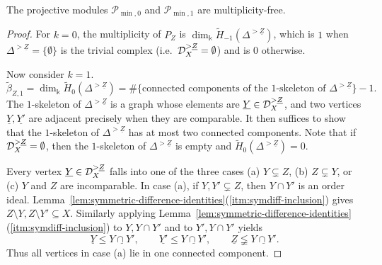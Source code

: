 \documentclass[a4paper,leqno]{amsart}
\begin{document}
\begin{prop}\label{prop:low-degree-multiplicity}
The projective modules $\mathcal P_{\min,0}$ and $\mathcal P_{\min,1}$ are multiplicity-free.
\end{prop}

\begin{proof}
For $k=0$, the multiplicity of $P_Z$ is $\dim_{\Bbbk}\widetilde H_{-1}(\Delta^{>\underline{Z}})$, which is $1$ when $\Delta^{>\underline{Z}}=\{\emptyset\}$ is the trivial complex (i.e.\ $\mathcal D_X^{>\underline{Z}}=\emptyset$) and is $0$ otherwise.

Now consider $k=1$.   
\begin{equation*}
 \widetilde\beta_{Z,1}
 =\dim_{\Bbbk}\widetilde H_0(\Delta^{>\underline{Z}})
 =\#\{\text{connected components of the $1$-skeleton of }\Delta^{>\underline{Z}}\}-1.
\end{equation*}
The $1$-skeleton of $\Delta^{>\underline{Z}}$ is a graph whose  elements are $\underline{Y}\in\mathcal D_X^{>\underline{Z}}$, and two vertices $\underline{Y},\underline{Y'}$ are adjacent precisely when they are comparable. It then suffices to show that the $1$-skeleton of $\Delta^{>\underline{Z}}$ has at most two connected components. Note that if $\mathcal D_X^{>\underline{Z}}=\emptyset$, then the $1$-skeleton of $\Delta^{>\underline{Z}}$ is empty and $\widetilde H_0(\Delta^{>\underline{Z}})=0$.

Every vertex $\underline{Y}\in \mathcal D_X^{>\underline{Z}}$ falls into one of the three cases (a) $Y\subsetneq Z$, (b) $Z\subsetneq Y$, or (c) $Y$ and $Z$ are incomparable.  In case (a), if $Y,Y'\subsetneq Z$, then $Y\cap Y'$ is an order ideal. Lemma~\ref{lem:symmetric-difference-identities}\textup{(\ref{itm:symdiff-inclusion})} gives $Z\setminus Y,Z\setminus Y'\subseteq X$. Similarly applying Lemma~\ref{lem:symmetric-difference-identities}\textup{(\ref{itm:symdiff-inclusion})} to $Y,Y\cap Y'$ and to $Y',Y\cap Y'$ yields
\[
 \underline{Y}\le \underline{Y\cap Y'},\qquad
 \underline{Y'}\le \underline{Y\cap Y'},\qquad
 \underline{Z}\lneqq \underline{Y\cap Y'}.
\]
Thus all vertices in case (a) lie in one connected component.


\end{proof}
\end{document}
